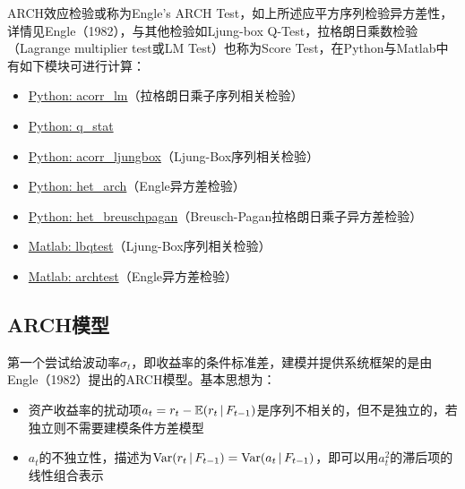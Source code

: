 \documentclass[11pt]{article}
\begin{document}
\begin{remark}
    ARCH效应检验或称为Engle's ARCH Test，如上所述应平方序列检验异方差性，详情见Engle（1982），与其他检验如Ljung-box Q-Test，拉格朗日乘数检验（Lagrange multiplier test或LM Test）也称为Score Test，在Python与Matlab中有如下模块可进行计算：
    \begin{itemize}
        \item \href{https://www.statsmodels.org/stable/generated/statsmodels.stats.diagnostic.acorr\_lm.html}{Python: acorr\_lm}（拉格朗日乘子序列相关检验）
        \item \href{https://www.statsmodels.org/stable/generated/statsmodels.tsa.stattools.q_stat.html#statsmodels.tsa.stattools.q_stat}{Python: q\_stat}
        \item \href{https://www.statsmodels.org/stable/generated/statsmodels.stats.diagnostic.acorr\_ljungbox.html}{Python: acorr\_ljungbox}（Ljung-Box序列相关检验）
        \item \href{https://www.statsmodels.org/stable/generated/statsmodels.stats.diagnostic.het\_arch.html}{Python: het\_arch}（Engle异方差检验）
        \item \href{https://www.statsmodels.org/stable/generated/statsmodels.stats.diagnostic.het\_breuschpagan.html}{Python: het\_breuschpagan}（Breusch-Pagan拉格朗日乘子异方差检验）
        \item \href{https://www.mathworks.com/help/econ/lbqtest.html}{Matlab: lbqtest}（Ljung-Box序列相关检验）
        \item \href{https://www.mathworks.com/help/econ/archtest.html}{Matlab: archtest}（Engle异方差检验）
    \end{itemize}
\end{remark}

\subsection{ARCH模型}

第一个尝试给波动率$\sigma_t$，即收益率的条件标准差，建模并提供系统框架的是由Engle（1982）提出的ARCH模型。基本思想为：
\begin{itemize}
    \item 资产收益率的扰动项$a_t = r_t - \mathbb{E}(r_t \,\vert\, F_{t-1})$是序列不相关的，但不是独立的，若独立则不需要建模条件方差模型
    \item $a_t$的不独立性，描述为$\operatorname{Var}(r_t \,\vert\, F_{t-1}) = \operatorname{Var}(a_t \,\vert\, F_{t-1})$，即可以用$a_{t}^{2}$的滞后项的线性组合表示
\end{itemize}
\end{document}
